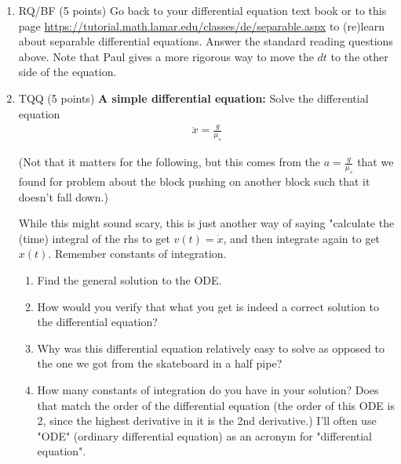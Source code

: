 \documentclass[12pt]{article}
\begin{document}
\begin{enumerate}
\begin{enumerate}
  \end{enumerate}


  \item RQ/BF (5 points)  Go back to your differential equation text book or to this page
  \url{https://tutorial.math.lamar.edu/classes/de/separable.aspx} to (re)learn about separable differential equations.  Answer the standard reading questions above.  Note that Paul gives a more rigorous way to move the $dt$ to the other side of the equation.

  \item TQQ (5 points) \textbf{A simple differential equation:} Solve the differential equation
  \begin{align}
      \ddot x = \frac{g}{\mu_s}
  \end{align}

  (Not that it matters for the following, but this comes from the $a = \frac{g}{\mu_s}$ that we found for problem about the block pushing on another block such that it doesn't fall down.)

  While this might sound scary, this is just another way of saying "calculate the (time) integral of the rhs to get $v(t) = \dot x$, and then integrate again to get $x(t)$. Remember constants of integration.

  \begin{enumerate}
    \item Find the general solution to the ODE.
      \item How would you verify that what you get is indeed a correct solution to the differential equation?
      \item Why was this differential equation relatively easy to solve as opposed to the one we got from the skateboard in a half pipe?
      \item How many constants of integration do you have in your solution? Does that match the order of the differential equation (the order of this ODE is 2, since the highest derivative in it is the 2nd derivative.) I'll often use "ODE" (ordinary differential equation) as an acronym for "differential equation".
  \end{enumerate}

  \soln{

}
\end{enumerate}
\end{document}
